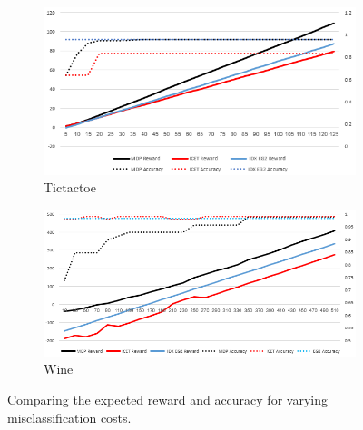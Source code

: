 \documentclass[letterpaper]{article}
\theoremstyle{definition}
\begin{document}
\begin{figure}[ht]
    \quad
    \begin{subfigure}[t]{0.45\textwidth}\vskip 0pt
		\centering
		\includegraphics[scale=0.4]{Tictactoe}
		\caption{Tictactoe}\label{fig:Tictactoe}		
	\end{subfigure}
    \quad
    \begin{subfigure}[t]{0.45\textwidth}\vskip 0pt
		\centering
		\includegraphics[scale=0.38]{Wine}
		\caption{Wine}\label{fig:Wine}		
	\end{subfigure}
    \caption{Comparing the expected reward and accuracy for varying misclassification costs.}
    \label{fig:RewardVsAccuracy}
\end{figure}

%
%
\end{document}
